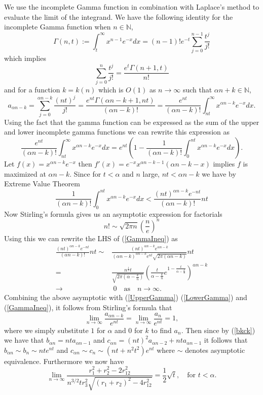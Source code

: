 \documentclass[12pt]{amsart}
\theoremstyle{remark}
\begin{document}
We use the incomplete Gamma function in combination with Laplace's method to evaluate the limit of the integrand.  We have the following identity for the incomplete Gamma function when $n\in\mathbb{N}$,
\[\Gamma(n,t):=\int_t^\infty x^{n-1}e^{-x}dx=(n-1)!e^{-t}\sum_{j=0}^{n-1}\frac{t^j}{j!}\]
which implies
\[\sum_{j=0}^n\frac{t^j}{j!}=\frac{e^t\Gamma(n+1,t)}{n!}\]
and for a function $k=k(n)$ which is $O(1)$ as $n\rightarrow \infty$ such that $\alpha n +k\in\mathbb{N}$,
\begin{equation}
	\label{UpperGamma}
	a_{\alpha n-k}=\sum_{j=0}^{\alpha n-k}\frac{(nt)^j}{j!}
	=\frac{e^{nt}\Gamma(\alpha n-k+1,nt)}{(\alpha n-k)!}
	=\frac{e^{nt}}{(\alpha n-k)!}\int_{nt}^\infty x^{\alpha n-k}e^{-x}dx.
\end{equation}
Using the fact that the gamma function can be expressed as the sum of the upper and lower incomplete gamma functions we can rewrite this expression as
\begin{equation}
	\label{LowerGamma}
	\frac{e^{nt}}{(\alpha n-k)!}\int_{nt}^\infty x^{\alpha n-k}e^{-x}dx
	=e^{nt}\left(1-\frac{1}{(\alpha n-k)!}\int_0^{nt} x^{\alpha n-k}e^{-x}dx\right).
\end{equation}
Let $f(x)=x^{\alpha n-k}e^{-x}$ then $f'(x)=e^{-x}x^{\alpha n - k - 1}(\alpha n - k - x)$ implies $f$ is maximized at $\alpha n - k$. Since for $t<\alpha$ and $n$ large, $nt < \alpha n - k$ we have by Extreme Value Theorem
\begin{equation}
\label{GammaIneq}
\frac{1}{(\alpha n-k)!}\int_0^{nt} x^{\alpha n-k}e^{-x}dx <
\frac{(nt)^{\alpha n - k}e^{-nt}}{(\alpha n - k)!}nt
\end{equation}
Now Stirling's formula gives us an asymptotic expression for factorials
\[
n!\sim \sqrt{2\pi n}\left(\frac{n}{e}\right)^n
\]
Using this we can rewrite the LHS of (\ref{GammaIneq}) as
\begin{align*}
\frac{(nt)^{\alpha n - k}e^{-nt}}{(\alpha n - k)!}nt \sim
&\frac{(nt)^{\alpha n - k}e^{\alpha n - k}}{(\alpha n - k)^{\alpha n - k}e^{nt}\sqrt{2\pi (\alpha n - k)}}nt
\\=& \frac{n^{\frac{1}{2}}t}{\sqrt{2\pi(\alpha - \frac{k}{n})}}\left(\frac{t}{\alpha - \frac{k}{n}}e^{1 - \frac{t}{\alpha - \frac{k}{n}}}\right)^{\alpha n - k}
\\ \rightarrow& \ 0 \quad\text{as}\quad n\rightarrow\infty.
\end{align*}
Combining the above asymptotic with (\ref{UpperGamma}) (\ref{LowerGamma}) and (\ref{GammaIneq}), it follows from Stirling's formula that
\[\lim_{n\rightarrow\infty}\frac{a_{\alpha n-k}}{e^{nt}}=\lim_{n\rightarrow\infty}\frac{a_{n}}{e^{nt}}=1,\]
where we simply substitute $1$ for $\alpha$ and $0$ for $k$ to find $a_n$.  Then since by (\ref{bkck}) we have that $b_{\alpha n} = nt a_{\alpha n - 1}$ and $c_{\alpha n} = (nt)^2a_{\alpha n - 2} + nt a_{\alpha n - 1}$ it follows that $b_{\alpha n}\sim b_n\sim nte^{nt}$ and $c_{\alpha n}\sim c_n\sim(nt+n^2t^2)e^{nt}$ where $\sim$ denotes asymptotic equivalence. Furthermore we now have
\[\lim_{n\rightarrow\infty}\frac{r_1^2+r_2^2-2r_{12}^2}{n^{3/2}t r_3^2\sqrt{(r_1+r_2)^2-4r_{12}^2}}=\frac{1}{2}\sqrt{t},\quad\text{for $t<\alpha$}.\]
\end{document}
